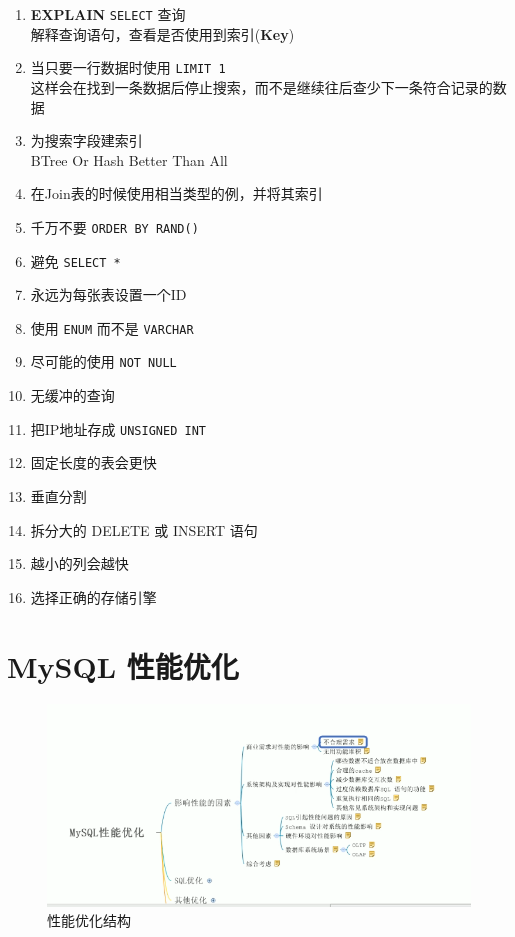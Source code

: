 \documentclass[UTF8,a4paper,12pt]{ctexbook}
\begin{document}
		\begin{enumerate}
			\item \textbf{EXPLAIN} \verb|SELECT| 查询 \\ 解释查询语句，查看是否使用到索引(\textbf{Key})
			\item 当只要一行数据时使用 \verb|LIMIT 1|  \\ 这样会在找到一条数据后停止搜索，而不是继续往后查少下一条符合记录的数据
			\item 为搜索字段建索引 \\ BTree Or Hash Better Than All
			\item 在Join表的时候使用相当类型的例，并将其索引
			\item 千万不要 \verb|ORDER BY RAND()|
			\item 避免 \verb|SELECT *|
			\item 永远为每张表设置一个ID
			\item 使用 \verb|ENUM| 而不是 \verb|VARCHAR|
			\item 尽可能的使用 \verb|NOT NULL|
			\item 无缓冲的查询
			\item 把IP地址存成 \verb|UNSIGNED INT|
			\item 固定长度的表会更快
			\item 垂直分割
			\item 拆分大的 DELETE 或 INSERT 语句
			\item 越小的列会越快
			\item 选择正确的存储引擎
		\end{enumerate}
		

\chapter{MySQL 性能优化}
	\begin{figure}[H]
		\centering
		\includegraphics[scale=0.7]{xingNeng}
		\caption{性能优化结构}
	\end{figure}
	
\end{document}
